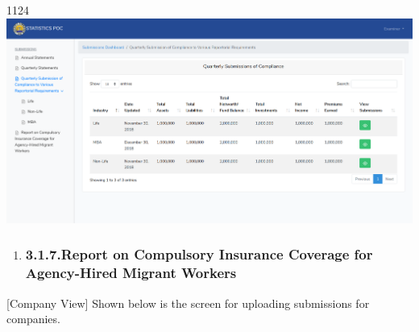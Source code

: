 \documentclass{article}
\begin{document}
{1124}
\includegraphics[keepaspectratio=true]{up-ic-screens/image79}{}%

\begin{enumerate}[noitemsep,topsep=\mdcompacttopsep]%

\item{}
\subsubsection{3.1.7.\hspace*{0.5em}Report on Compulsory Insurance Coverage for Agency-Hired Migrant Workers}\label{sec-report-on-compulsory-insurance-coverage-for-agency-hired-migrant-workers}%
\end{enumerate}%

\noindent{}[Company View] Shown below is the screen for
uploading submissions for companies.%
\end{document}
